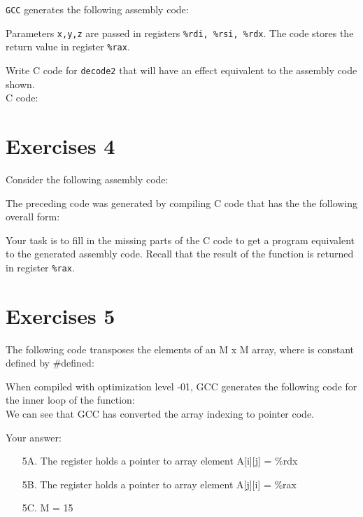 \documentclass[a4paper,12pt]{article}
\begin{document}
\texttt{GCC} generates the following assembly code:



Parameters \texttt{x,y,z} are passed in registers \texttt{\%rdi, \%rsi, \%rdx}. The code stores the return value in register \texttt{\%rax}.

Write C code for \texttt{decode2} that will have an effect equivalent to the assembly code shown.\\[1cm]

C code:



\section{Exercises 4}
Consider the following assembly code:



The preceding code was generated by compiling C code that has the the following overall form:



Your task is to fill in the missing parts of the C code to get a program equivalent to the generated assembly code. Recall that the result of the function is returned in register \texttt{\%rax}.


\section{Exercises 5}
The following code transposes the elements of an M x M array, where is constant defined by \#defined:



When compiled with optimization level -01, GCC generates the following code for the inner loop of the function: \\[0.5cm]



We can see that GCC has converted the array indexing to pointer code.

Your answer:
\begin{enumerate}
	\item[5A.] The register holds a pointer to array element A[i][j] = \%rdx %
	\item[5B.] The register holds a pointer to array element A[j][i] = \%rax  %
	\item[5C.] M = 15 %
\end{enumerate}
\end{document}

